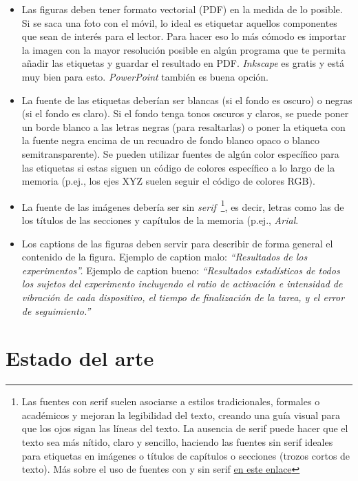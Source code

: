 \documentclass[a4paper,11pt,reqno,twoside]{memoir}
\begin{document}
\begin{itemize}
    \item Las figuras deben tener formato vectorial (PDF) en la medida de lo posible. Si se saca una foto con el móvil, lo ideal es etiquetar aquellos componentes que sean de interés para el lector. Para hacer eso lo más cómodo es importar la imagen con la mayor resolución posible en algún programa que te permita añadir las etiquetas y guardar el resultado en PDF. \textit{Inkscape} es gratis y está muy bien para esto. \textit{PowerPoint} también es buena opción. 
    \item La fuente de las etiquetas deberían ser blancas (si el fondo es oscuro) o negras (si el fondo es claro). Si el fondo tenga tonos oscuros y claros, se puede poner un borde blanco a las letras negras (para resaltarlas) o poner la etiqueta con la fuente negra encima de un recuadro de fondo blanco opaco o blanco semitransparente). Se pueden utilizar fuentes de algún color específico para las etiquetas si estas siguen un código de colores específico a lo largo de la memoria (p.ej., los ejes XYZ suelen seguir el código de colores RGB).
    \item La fuente de las imágenes debería ser sin \textit{serif}~\footnote{Las fuentes con serif suelen asociarse a estilos tradicionales, formales o académicos y mejoran la legibilidad del texto, creando una guía visual para que los ojos sigan las líneas del texto. La ausencia de serif puede hacer que el texto sea más nítido, claro y sencillo, haciendo las fuentes sin serif ideales para etiquetas en imágenes o títulos de capítulos o secciones (trozos cortos de texto). Más sobre el uso de fuentes con y sin serif \href{https://www.linkedin.com/advice/1/what-some-advantages-disadvantages-using-serif?lang=es&originalSubdomain=es}{en este enlace}}, es decir, letras como las de los títulos de las secciones y capítulos de la memoria (p.ej., \textit{Arial}. 
    \item Los captions de las figuras deben servir para describir de forma general el contenido de la figura. Ejemplo de caption malo: \textit{``Resultados de los experimentos''.} Ejemplo de caption bueno: \textit{``Resultados estadísticos de todos los sujetos del experimento incluyendo el ratio de activación e intensidad de vibración de cada dispositivo, el tiempo de finalización de la tarea, y el error de seguimiento.''}
\end{itemize}

\section{Estado del arte}
\label{sec:estado_del_arte}
\end{document}
